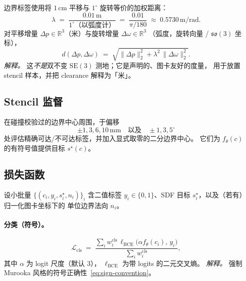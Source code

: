 \documentclass[UTF8,a4paper,11pt,fontset=fandol]{ctexart}
\newcommand{\SE}{\mathrm{SE}}
\newcommand{\R}{\mathbb{R}}
\begin{document}
边界标签使用将 \(1\,\mathrm{cm}\) 平移与 \(1^{\circ}\) 旋转等价的加权距离：
\begin{equation}
\label{eq:lambda-metric}
  \lambda
  \;=\;
  \frac{0.01\,\mathrm{m}}{1^{\circ}\text{（以弧度计）}}
  \;=\;
  \frac{0.01}{\pi/180}
  \;\approx\;
  0.5730\,\mathrm{m/rad}.
\end{equation}
对平移增量 \(\Delta p\in\R^{3}\)（米）与旋转增量 \(\Delta\omega\in\R^{3}\)
（弧度，旋转向量 / \(\mathfrak{so}(3)\) 坐标），
\begin{equation}
\label{eq:se3-distance}
  d(\Delta p,\Delta\omega)
  \;=\;
  \sqrt{
    \|\Delta p\|_{2}^{2}
    +
    \lambda^{2}\,\|\Delta\omega\|_{2}^{2}
  }.
\end{equation}
\emph{解释。}
这\emph{不是}双不变 \(\SE(3)\) 测地；它是声明的、图卡友好的度量，
用于放置 stencil 样本，并把 clearance 解释为「米」。

\subsection{Stencil 监督}
\label{sec:stencil}

在碰撞校验过的边界中心周围，于偏移
\begin{equation}
\label{eq:stencil-offsets}
  \pm 1,3,6,10\,\mathrm{mm}
  \quad\text{以及}\quad
  \pm 1,3,5^{\circ}
\end{equation}
处评估精确可达/不可达标签，并加入显式取零的二分边界中心。
它们为 \(f_{\theta}(c)\) 的有符号值提供目标 \(s^{\star}(c)\)。

\subsection{损失函数}
\label{sec:losses}

设小批量 \(\{(c_{i},y_{i},s_{i}^{\star},n_{i})\}_{i}\) 含二值标签
\(y_{i}\in\{0,1\}\)、SDF 目标 \(s_{i}^{\star}\)，以及（若有）归一化图卡坐标下的
单位边界法向 \(n_{i}\)。

\paragraph{分类（符号）。}
\begin{equation}
\label{eq:loss-cls}
  \mathcal{L}_{\mathrm{cls}}
  \;=\;
  \frac{
    \sum_{i} w_{i}^{\mathrm{cls}}\,
    \ell_{\mathrm{BCE}}\bigl(\alpha f_{\theta}(c_{i}),\, y_{i}\bigr)
  }{
    \sum_{i} w_{i}^{\mathrm{cls}}
  },
\end{equation}
其中 \(\alpha\) 为 logit 尺度（默认 \(3\)），
\(\ell_{\mathrm{BCE}}\) 为带 logits 的二元交叉熵。
\emph{解释。}
强制 Murooka 风格的符号正确性~\eqref{eq:sign-convention}。
\end{document}
